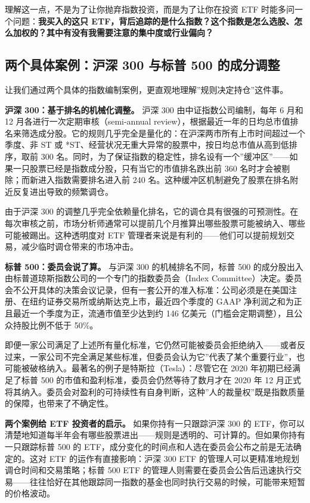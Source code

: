 \documentclass[a4paper,11pt,oneside,fontset=none,UTF8,zihao=-4]{ctexbook}
\begin{document}
理解这一点，不是为了让你抛弃指数投资，而是为了让你在投资 ETF
时能多问一个问题：\textbf{我买入的这只
ETF，背后追踪的是什么指数？这个指数是怎么选股、怎么加权的？其中有没有我需要注意的集中度或行业偏向？}

\subsection{两个具体案例：沪深 300 与标普 500
的成分调整}\label{ux4e24ux4e2aux5177ux4f53ux6848ux4f8bux6caaux6df1-300-ux4e0eux6807ux666e-500-ux7684ux6210ux5206ux8c03ux6574}

让我们通过两个具体的指数编制案例，更直观地理解''规则决定持仓''这件事。

\textbf{沪深 300：基于排名的机械化调整。} 沪深 300
由中证指数公司编制，每年 6 月和 12 月各进行一次定期审核（semi-annual
review），根据最近一年的日均总市值排名来筛选成分股。它的规则几乎完全是量化的：在沪深两市所有上市时间超过一个季度、非
ST 或 *ST、经营状况无重大异常的股票中，按日均总市值从高到低排序，取前
300
名。同时，为了保证指数的稳定性，排名设有一个''缓冲区''------如果一只股票已经是指数成分股，只有当它的市值排名跌出前
360 名时才会被剔除；而新进入指数需要排名进入前 240
名。这种缓冲区机制避免了股票在排名附近反复进出导致的频繁调仓。

由于沪深 300
的调整几乎完全依赖量化排名，它的调仓具有很强的可预测性。在每次审核之前，市场分析师通常可以提前几个月推算出哪些股票可能被纳入、哪些可能被踢出。这种透明度对
ETF
管理者来说是有利的------他们可以提前规划交易，减少临时调仓带来的市场冲击。

\textbf{标普 500：委员会说了算。} 与沪深 300 的机械排名不同，标普 500
的成分股出入由标普道琼斯指数公司的一个专门的指数委员会（Index
Committee）决定。委员会不公开具体的决策会议记录，但有一套公开的准入标准：公司必须是在美国注册、在纽约证券交易所或纳斯达克上市，最近四个季度的
GAAP 净利润之和为正且最近一个季度为正，流通市值至少达到约 146
亿美元（门槛会定期调整），且公众持股比例不低于 50\%。

即便一家公司满足了上述所有量化标准，它仍然可能被委员会拒绝纳入------或者反过来，一家公司不完全满足某些标准，但委员会认为它''代表了某个重要行业''，也可能被破格纳入。最著名的例子是特斯拉（Tesla）：尽管它在
2020 年初期已经满足了标普 500 的市值和盈利标准，委员会仍然等待了数月才在
2020 年 12
月正式将其纳入。委员会对盈利的可持续性有自身判断，这种''人的裁量权''既是指数质量的保障，也带来了不确定性。

\textbf{两个案例给 ETF 投资者的启示。} 如果你持有一只跟踪沪深 300 的
ETF，你可以清楚地知道每半年会有哪些股票进出------规则是透明的、可计算的。但如果你持有一只跟踪标普
500 的 ETF，成分变化的时间点和人选在委员会公布之前是无法确定的。这对 ETF
的运作有直接影响：沪深 300 ETF
的管理人可以更精准地规划调仓时间和交易策略；标普 500 ETF
的管理人则需要在委员会公告后迅速执行交易------往往恰好在其他跟踪同一指数的基金也同时执行交易的时候，可能带来短暂的价格波动。
\end{document}
